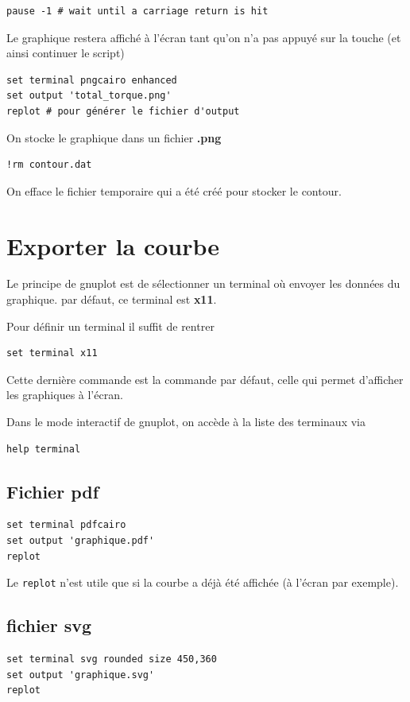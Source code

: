 \documentclass[a4paper,twoside]{article}
\begin{document}
\begin{verbatim}
pause -1 # wait until a carriage return is hit
\end{verbatim}
Le graphique restera affiché à l'écran tant qu'on n'a pas appuyé sur la touche  (et ainsi continuer le script)

\begin{verbatim}
set terminal pngcairo enhanced
set output 'total_torque.png'
replot # pour générer le fichier d'output
\end{verbatim}
On stocke le graphique dans un fichier \textbf{.png}

\begin{verbatim}
!rm contour.dat
\end{verbatim}
On efface le fichier temporaire qui a été créé pour stocker le contour.

\section{Exporter la courbe}\label{sec:terminal}
Le principe de gnuplot est de sélectionner un terminal où envoyer les données du graphique. par défaut, ce terminal est \textbf{x11}. 

Pour définir un terminal il suffit de rentrer
\begin{verbatim}
set terminal x11
\end{verbatim}
Cette dernière commande est la commande par défaut, celle qui permet d'afficher les graphiques à l'écran.

Dans le mode interactif de gnuplot, on accède à la liste des terminaux via
\begin{verbatim}
help terminal
\end{verbatim}


\subsection{Fichier pdf}
\begin{verbatim}
set terminal pdfcairo
set output 'graphique.pdf'
replot
\end{verbatim}

\begin{remarque}
Le \texttt{replot} n'est utile que si la courbe a déjà été affichée (à l'écran par exemple).
\end{remarque}

\subsection{fichier svg}
\begin{verbatim}
set terminal svg rounded size 450,360
set output 'graphique.svg'
replot
\end{verbatim}
\end{document}
